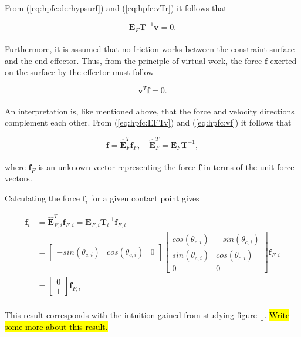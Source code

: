 From (\ref{eq:hpfc:derhypsurf}) and (\ref{eq:hpfc:vTr}) it follows that

\begin{equation}\label{eq:hpfc:EFTv}
    \mathbf{E}_F \mathbf{T}^{-1} \mathbf{v} = 0.
\end{equation}
\\
Furthermore, it is assumed that no friction works between the constraint surface and the end-effector. Thus, from the principle of virtual work, the force $\mathbf{f}$ exerted on the surface by the effector must follow

\begin{equation}\label{eq:hpfc:vf}
    \mathbf{v}^T \mathbf{f} = 0.
\end{equation}
\\
An interpretation is, like mentioned above, that the force and velocity directions complement each other. From (\ref{eq:hpfc:EFTv}) and (\ref{eq:hpfc:vf}) it follows that

\begin{equation}
    \mathbf{f} = \hat{\mathbf{E}}_F^T \mathbf{f}_F, \quad \hat{\mathbf{E}}_F^T = \mathbf{E}_F \mathbf{T}^{-1},
\end{equation}
\\
where $\mathbf{f}_F$ is an unknown vector representing the force $\mathbf{f}$ in terms of the unit force vectors.

Calculating the force $\mathbf{f}_i$ for a given contact point gives

\begin{equation}
    \begin{split}
        \mathbf{f}_i &= \hat{\mathbf{E}}_{F,i}^T \mathbf{f}_{F,i} = \mathbf{E}_{F,i} \mathbf{T}_i^{-1} \mathbf{f}_{F,i}\\
        &=
        \begin{bmatrix}
            -sin(\theta_{c,i}) & cos(\theta_{c,i}) & 0
        \end{bmatrix}
        \begin{bmatrix}
            cos(\theta_{c,i}) & -sin(\theta_{c,i}) \\
            sin(\theta_{c,i}) & cos(\theta_{c,i}) \\
            0 & 0
        \end{bmatrix}
        \mathbf{f}_{F,i}\\
        &=
        \begin{bmatrix}
            0 \\ 1
        \end{bmatrix}
        \mathbf{f}_{F,i}
    \end{split}
\end{equation}
\\
This result corresponds with the intuition gained from studying figure \ref{}. \hl{Write some more about this result.}


